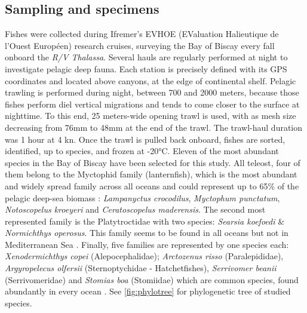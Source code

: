 

\subsection{Sampling and specimens}

Fishes were collected during Ifremer's EVHOE (EValuation Halieutique de l'Ouest Européen) research cruises, surveying the Bay of Biscay every fall onboard the \textit{R/V Thalassa}.
Several hauls are regularly performed at night to investigate pelagic deep fauna. Each station is precisely defined with its GPS coordinates and located above canyons, at the edge of continental shelf. 
Pelagic trawling is performed during night, between 700 and 2000 meters, because those fishes perform diel vertical migrations and tends to come closer to the surface at nighttime. To this end, 25 meters-wide opening trawl is used, with as mesh size decreasing from 76mm to 48mm at the end of the trawl. The trawl-haul duration was 1 hour at 4 kn. 
Once the trawl is pulled back onboard, fishes are sorted, identified, up to species, and frozen at -20°C. Eleven of the most abundant species in the Bay of Biscay have been selected for this study. All teleost, four of them belong to the Myctophid family (lanternfish), which is the most abundant and widely spread family across all oceans \citep{debusserolles2014} and could represent up to 65\% of the pelagic deep-sea biomass \citep{poulsen2013}: \textit{Lampanyctus crocodilus}, \textit{Myctophum punctatum}, \textit{Notoscopelus kroeyeri} and \textit{Ceratoscopelus maderensis}. The second most represented family is the Platytroctidae with two species: \textit{Searsia koefoedi} \& \textit{Normichthys operosus}. This family seems to be found in all oceans but not in Mediterranean Sea \citep{orrell2016}. Finally, five families are represented by one species each: \textit{Xenodermichthys copei} (Alepocephalidae); \textit{Arctozenus risso} (Paralepididae), \textit{Argyropelecus olfersii} (Sternoptychidae - Hatchetfishes), \textit{Serrivomer beanii} (Serrivomeridae) and \textit{Stomias boa} (Stomiidae) which are common species, found abundantly in every ocean \citep{carvalho1988,froese2019,geidner2008,germain2019}. See \ref{fig:phylotree} for phylogenetic tree of studied species. 


